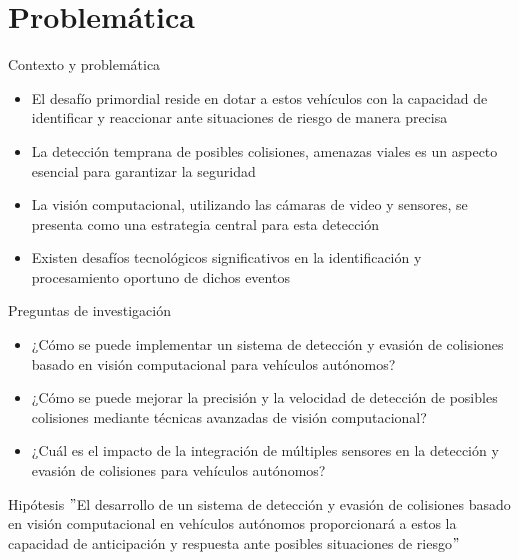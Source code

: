 \documentclass[8pt]{beamer}
\begin{document}
    \section{Problemática}
    \begin{frame}{Contexto y problemática}
        \begin{itemize}
            \item El desafío primordial reside en dotar a estos vehículos con la capacidad de identificar y reaccionar ante situaciones de riesgo de manera precisa
            \item La detección temprana de posibles colisiones, amenazas viales es un aspecto esencial para garantizar la seguridad
            \item La visión computacional, utilizando las cámaras de video y sensores, se presenta como una estrategia central para esta detección
            \item Existen desafíos tecnológicos significativos en la identificación y procesamiento oportuno de dichos eventos
        \end{itemize}
    \end{frame}
    \begin{frame}{Preguntas de investigación}
        \begin{itemize}
            \item ¿Cómo se puede implementar un sistema de detección y evasión de colisiones basado en visión computacional para vehículos autónomos?
            \item ¿Cómo se puede mejorar la precisión y la velocidad de detección de posibles colisiones mediante técnicas avanzadas de visión computacional?
            \item ¿Cuál es el impacto de la integración de múltiples sensores en la detección y evasión de colisiones para vehículos autónomos?
        \end{itemize}
    \end{frame}
    \begin{frame}{Hipótesis}
        \("\)El desarrollo de un sistema de detección y evasión de colisiones basado en visión computacional en vehículos autónomos
        proporcionará a estos la capacidad de anticipación y respuesta ante posibles situaciones de riesgo\("\)
    \end{frame}
\end{document}
